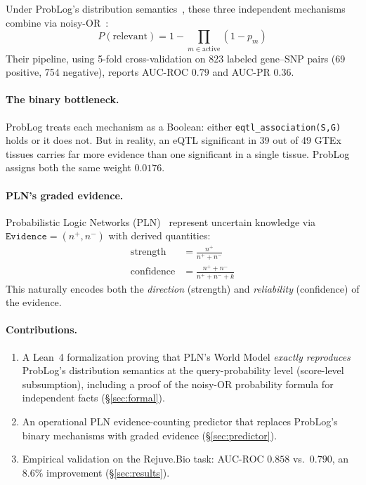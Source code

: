 \documentclass[]{article}
\newcommand{\code}[1]{\texttt{#1}}
\newcommand{\ty}[1]{\ensuremath{\mathtt{#1}}}
\newcommand{\Evidence}{\ty{Evidence}}
\newcommand{\nplus}{\ensuremath{n^{+}}}
\newcommand{\nminus}{\ensuremath{n^{-}}}
\begin{document}
\noindent
Under ProbLog's distribution semantics~\cite{Sato1995}, these three independent
mechanisms combine via noisy-OR~\cite{Pearl1988NoisyOR}:
\[
P(\text{relevant}) = 1 - \prod_{m \in \text{active}} (1 - p_m)
\]
Their pipeline, using 5-fold cross-validation on 823 labeled gene--SNP pairs
(69 positive, 754 negative), reports AUC-ROC $0.79$ and AUC-PR $0.36$.

\paragraph{The binary bottleneck.}
ProbLog treats each mechanism as a Boolean: either \code{eqtl\_association(S,G)}
holds or it does not.  But in reality, an eQTL significant in 39 out of 49 GTEx
tissues carries far more evidence than one significant in a single tissue.  ProbLog
assigns both the same weight $0.0176$.

\paragraph{PLN's graded evidence.}
Probabilistic Logic Networks (PLN)~\cite{goertzel2009pln} represent uncertain
knowledge via $\Evidence = (\nplus, \nminus)$ with derived quantities:
\begin{align}
  \text{strength} &= \frac{\nplus}{\nplus + \nminus} \label{eq:strength} \\
  \text{confidence} &= \frac{\nplus + \nminus}{\nplus + \nminus + k} \label{eq:confidence}
\end{align}
This naturally encodes both the \emph{direction} (strength) and \emph{reliability}
(confidence) of the evidence.

\paragraph{Contributions.}
\begin{enumerate}
\item A Lean~4 formalization proving that PLN's World Model \emph{exactly reproduces}
  ProbLog's distribution semantics at the query-probability level (score-level
  subsumption), including a proof of the noisy-OR probability formula for
  independent facts (\S\ref{sec:formal}).
\item An operational PLN evidence-counting predictor that replaces ProbLog's binary
  mechanisms with graded evidence (\S\ref{sec:predictor}).
\item Empirical validation on the Rejuve.Bio task: AUC-ROC $0.858$ vs.\ $0.790$,
  an $8.6\%$ improvement (\S\ref{sec:results}).
\end{enumerate}
\end{document}
